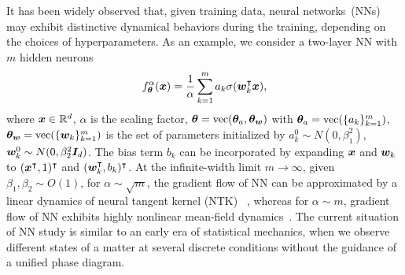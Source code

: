 \documentclass[twoside,11pt]{article}
\begin{document}
It has been widely observed that, given training data, neural networks~(NNs) may exhibit distinctive dynamical behaviors during the training, depending on the choices of hyperparameters. As an example, we consider a two-layer NN with $m$  hidden neurons
\begin{equation}\label{eq: 2LNN}
    f^{\alpha}_{\bm{\theta}}(\bm{x}) = \frac{1}{\alpha}\sum_{k=1}^{m}a_k\sigma(\bm{w}_k^{\intercal}\bm{x}),
\end{equation}
where $\bm{x}\in\mathbb{R}^{d}$, $\alpha$ is the scaling factor, $\bm{\theta}=\mathrm{vec}(\bm{\theta}_a,\bm{\theta}_{\bm{w}})$ with $\bm{\theta}_a=\mathrm{vec}(\{a_k\}_{k=1}^{m})$, $\bm{\theta}_{\bm{w}}=\mathrm{vec}(\{\bm{w}_k\}_{k=1}^{m})$ is the set of parameters initialized by $a_k^0\sim N(0, \beta_1^2)$, $\bm{w}_k^0\sim N(0, \beta_2^2 \bm{I}_d)$. The bias term $b_k$ can be incorporated by expanding $\bm{x}$ and $\bm{w}_k$ to $(\bm{x}^\intercal,1)^\intercal$ and $(\bm{w}_k^\intercal,b_k)^\intercal$. At the infinite-width limit $m\to\infty$, given $\beta_{1},\beta_{2}\sim O(1)$, for $\alpha\sim\sqrt{m}$, the gradient flow of NN can be approximated by a linear dynamics of neural tangent kernel (NTK) ~\cite{jacot_neural_2018,arora2019exact,zhang_type_2019}, whereas for $\alpha\sim m$, gradient flow of NN exhibits highly nonlinear mean-field dynamics~\cite{mei_mean_2018,rotskoff_parameters_2018,chizat_global_2018,sirignano_mean_2020}. The current situation of NN study is similar to an early era of statistical mechanics, when we observe different states of a matter at several discrete conditions without the guidance of a unified phase diagram.
\end{document}
